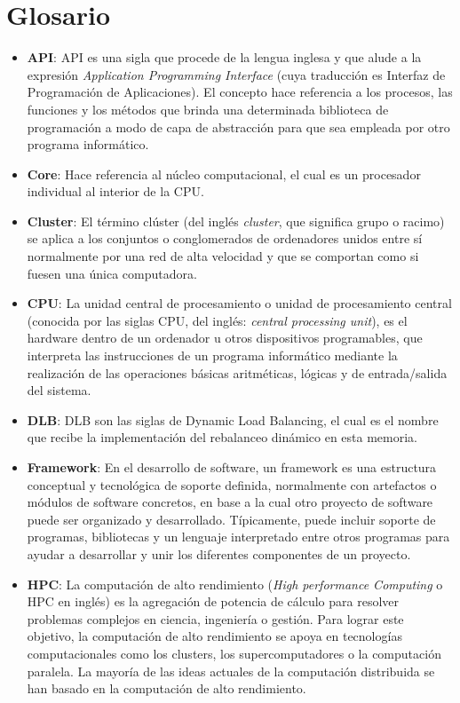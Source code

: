 \chapter{Glosario}
\label{glossary}

\begin{itemize}
    \item \textbf{API}: API es una sigla que procede de la lengua inglesa y que alude a la expresión \textit{Application Programming Interface} (cuya traducción es Interfaz de Programación de Aplicaciones). El concepto hace referencia a los procesos, las funciones y los métodos que brinda una determinada biblioteca de programación a modo de capa de abstracción para que sea empleada por otro programa informático.
    \item \textbf{Core}: Hace referencia al núcleo computacional, el cual es un procesador individual al interior de la CPU.
    \item \textbf{Cluster}: El término clúster (del inglés \textit{cluster}, que significa grupo o racimo) se aplica a los conjuntos o conglomerados de ordenadores unidos entre sí normalmente por una red de alta velocidad y que se comportan como si fuesen una única computadora.
    \item \textbf{CPU}: La unidad central de procesamiento o unidad de procesamiento central (conocida por las siglas CPU, del inglés: \textit{central processing unit}), es el hardware dentro de un ordenador u otros dispositivos programables, que interpreta las instrucciones de un programa informático mediante la realización de las operaciones básicas aritméticas, lógicas y de entrada/salida del sistema.
    \item \textbf{DLB}: DLB son las siglas de Dynamic Load Balancing, el cual es el nombre que recibe la implementación del rebalanceo dinámico en esta memoria.
    \item \textbf{Framework}: En el desarrollo de software, un framework es una estructura conceptual y tecnológica de soporte definida, normalmente con artefactos o módulos de software concretos, en base a la cual otro proyecto de software  puede ser organizado y desarrollado. Típicamente, puede incluir soporte de programas, bibliotecas y un lenguaje interpretado  entre otros programas para ayudar a desarrollar y unir los diferentes componentes de un proyecto.
    \item \textbf{HPC}: La computación de alto rendimiento (\textit{High performance Computing} o HPC en inglés) es la agregación de potencia de cálculo para resolver problemas complejos en ciencia, ingeniería o gestión. Para lograr este objetivo, la computación de alto rendimiento se apoya en tecnologías computacionales como los clusters, los supercomputadores o la computación paralela. La mayoría de las ideas actuales de la computación distribuida se han basado en la computación de alto rendimiento.

\end{itemize}
